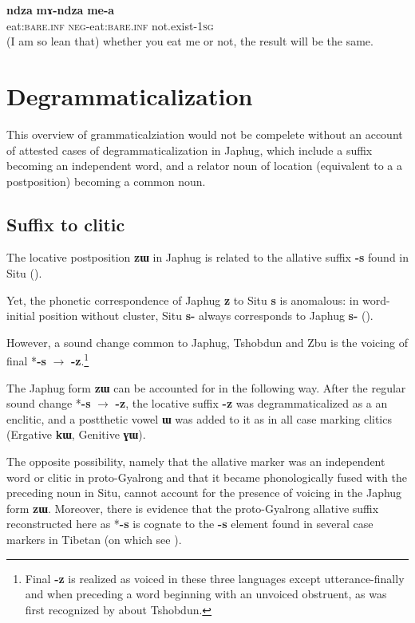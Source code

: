 \documentclass[oldfontcommands,oneside,a4paper,11pt]{article}
\newcommand{\ipa}[1]{\mbox{\phon\textbf{#1}}} %
\newcommand{\change}[2]{*\ipa{#1} $\rightarrow$ \ipa{#2}}
\begin{document}
\begin{exe}
\ex \label{ex:mAndza}
\gll \ipa{ndza} \ipa{mɤ-ndza} \ipa{me-a} \\
eat:\textsc{bare.inf} \textsc{neg}-eat:\textsc{bare.inf} not.exist-\textsc{1sg} \\
\glt (I am so lean that) whether you eat me or not, the result will be the same.
\end{exe}
 
 \section{Degrammaticalization}
 This overview of grammaticalziation would not be compelete without an account of attested cases of degrammaticalization in Japhug, which include a suffix  becoming an independent word, and a relator noun of location (equivalent to a a postposition) becoming a common noun.
 
 
 \subsection{Suffix to clitic}
The locative postposition  \ipa{zɯ} in Japhug is related to the allative suffix \ipa{-s} found in Situ (\citealt[330]{linxr93jiarong}).  

Yet, the phonetic correspondence of Japhug \ipa{z} to Situ \ipa{s} is anomalous: in word-initial position without cluster, Situ \ipa{s-} always corresponds to Japhug \ipa{s-}  (\citealt[317-8]{jacques04these}).

However, a sound change common to Japhug, Tshobdun and Zbu is the voicing of final \change{-s}{-z}.\footnote{Final \ipa{-z} is realized as voiced in these three languages except utterance-finally and when preceding a word beginning with an unvoiced obstruent, as was first recognized by  \citet{jackson05yingao} about Tshobdun.} 

The Japhug form \ipa{zɯ} can be accounted for in the following way. After the regular sound change \change{-s}{-z}, the locative suffix \ipa{-z} was degrammaticalized as a an enclitic, and a postthetic vowel \ipa{ɯ} was added to it as in all case marking clitics (Ergative \ipa{kɯ}, Genitive \ipa{ɣɯ}). 

 The opposite possibility, namely that the allative marker was an independent word or clitic in proto-Gyalrong and that it became phonologically fused with the preceding noun in Situ, cannot account for the presence of voicing in the Japhug form \ipa{zɯ}. Moreover, there is evidence that the proto-Gyalrong allative suffix reconstructed here as *\ipa{-s} is cognate to the \ipa{-s} element found in several case markers in Tibetan (on which see \citealt{hill12bas}).
  
\end{document}
